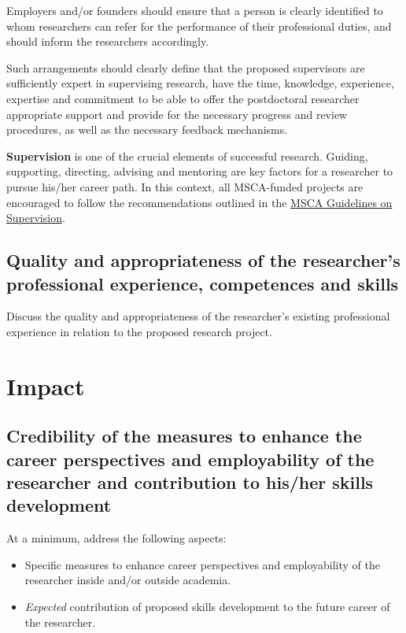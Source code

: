 \documentclass[11pt,draftproposal]{msca-pf}
\begin{document}
Employers and/or founders should ensure that a person is clearly identified to
whom researchers can refer for the performance of their professional duties, and
should inform the researchers accordingly.

Such arrangements should clearly define that the proposed supervisors are
sufficiently expert in supervising research, have the time, knowledge, experience,
expertise and commitment to be able to offer the postdoctoral researcher
appropriate support and provide for the necessary progress and review procedures,
as well as the necessary feedback mechanisms.

\textbf{Supervision} is one of the crucial elements of successful research. Guiding,
supporting, directing, advising and mentoring are key factors for a researcher
to pursue his/her career path. In this context, all MSCA-funded projects are
encouraged to follow the recommendations outlined in the
\href{https://data.europa.eu/doi/10.2766/508311}{MSCA Guidelines on Supervision}\footnotemark{}.


\subsection{Quality and appropriateness of the researcher's professional
experience, competences and skills}

Discuss the quality and appropriateness of the researcher’s existing professional
experience in relation to the proposed research project.

\section{Impact}

\subsection{Credibility of the measures to enhance the career perspectives
and employability of the researcher and contribution to his/her skills
development}

At a minimum, address the following aspects:

\begin{itemize}
    \item Specific measures to enhance career perspectives and employability of
    the researcher inside and/or outside academia.
    \item \emph{Expected} contribution of proposed skills development to the
    future career of the researcher.
\end{itemize}
\end{document}
